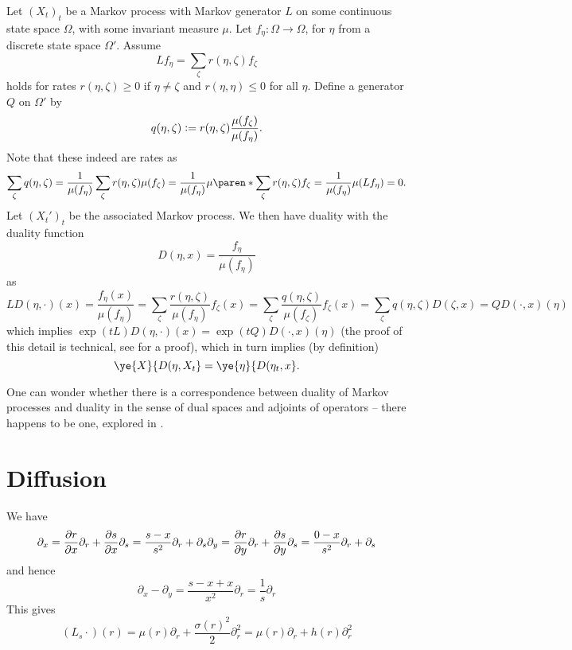 \documentclass{article}
\begin{document}
Let $(X_t)_t$ be a Markov process with Markov generator $L$ on some continuous state space $\Omega$, with some invariant measure $\mu$. Let $f_{\eta} \colon \Omega \to \Omega$, for $\eta$ from a discrete state space $\Omega'$. Assume
\[
L f_{\eta} = \sum_{\zeta} r(\eta, \zeta) f_{\zeta}
\]
holds for rates $r(\eta, \zeta) \ge 0$ if $\eta \ne \zeta$ and $r(\eta, \eta) \le 0$ for all $\eta$.  Define a generator $Q$ on $\Omega'$ by
\[
q(\eta, \zeta) \vcentcolon= r(\eta, \zeta)\frac{\mu(f_{\zeta})}{\mu(f_{\eta})}.
\]
Note that these indeed are rates as
\[
\sum_{\zeta} q(\eta, \zeta) = \frac{1}{\mu(f_{\eta})} \sum_{\zeta} r(\eta, \zeta)\mu(f_{\zeta}) = \frac{1}{\mu(f_{\eta})} \mu\paren*{\sum_{\zeta} r(\eta, \zeta) f_{\zeta}} = \frac{1}{\mu(f_{\eta})} \mu(L f_{\eta}) = 0.
\]
Let $(X_t')_t$ be the associated Markov process. We then have duality with the duality function
\[
D(\eta, x) = \frac{f_{\eta}}{\mu(f_{\eta})}
\]
as
\[
LD(\eta, \cdot)(x)
= \frac{f_{\eta}(x)}{\mu(f_{\eta})}
= \sum_{\zeta} \frac{r(\eta, \zeta)}{\mu(f_{\eta})} f_{\zeta}(x)
= \sum_{\zeta} \frac{q(\eta, \zeta)}{\mu(f_{\zeta})} f_{\zeta}(x)
= \sum_{\zeta} q(\eta, \zeta) D(\zeta, x)
= Q D(\cdot, x)(\eta)
\]
which implies
$\exp(tL) D(\eta, \cdot)(x) = \exp(tQ) D(\cdot, x)(\eta)$
(the proof of this detail is technical, see \cite{voss2011equivalence} for a proof), which in turn implies (by definition) %
\[
\ye{X}{D(\eta, X_t}
= \ye{\eta}{D(\eta_t, x}.
\]


One can wonder whether there is a correspondence between duality of Markov processes and duality in the sense of dual spaces and adjoints of operators -- there happens to be one, explored in \cite{jansen2014notion}. %




\section{Diffusion}

We have
\[
\partial_x
= \frac{\partial r}{\partial x}\partial_r + \frac{\partial s}{\partial x}\partial_s
= \frac{s - x}{s^2}\partial_r + \partial_s
\\\partial_y
= \frac{\partial r}{\partial y}\partial_r + \frac{\partial s}{\partial y}\partial_s
= \frac{0 - x}{s^2}\partial_r + \partial_s
\]
and hence
\[
\partial_x - \partial_y
= \frac{s - x + x}{x^2}\partial_r
= \frac{1}{s}\partial_r
\]
This gives
\[
(L_s \cdot)(r)
= \mu(r) \partial_r + \frac{\sigma(r)^2}{2} \partial_r^2
= \mu(r) \partial_r + h(r) \partial_r^2
\]
\end{document}
